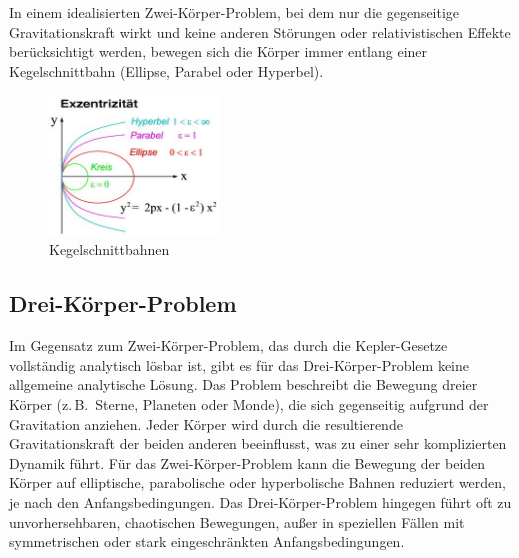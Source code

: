 \documentclass[a4paper,12pt,twoside]{article}
\begin{document}
In einem idealisierten Zwei-Körper-Problem, bei dem nur die gegenseitige Gravitationskraft wirkt und keine anderen Störungen oder relativistischen Effekte berücksichtigt werden, bewegen sich die Körper immer entlang einer Kegelschnittbahn (Ellipse, Parabel oder Hyperbel).
\begin{figure}[H]
	\centering
	\includegraphics[width=0.4\textwidth]{exzentrizitaet.jpg}
	\caption[Eintrag in Abbildungsverzeichnis von Kegelschnittbahnen]{Kegelschnittbahnen}
	\label{Exzentrizität}
\end{figure}

\subsection{Drei-Körper-Problem}
Im Gegensatz zum Zwei-Körper-Problem, das durch die Kepler-Gesetze vollständig analytisch lösbar ist, gibt es für das Drei-Körper-Problem keine allgemeine analytische Lösung. Das Problem beschreibt die Bewegung dreier Körper (z.\,B.\ Sterne, Planeten oder Monde), die sich gegenseitig aufgrund der Gravitation anziehen. Jeder Körper wird durch die resultierende Gravitationskraft der beiden anderen beeinflusst, was zu einer sehr komplizierten Dynamik führt.
Für das Zwei-Körper-Problem kann die Bewegung der beiden Körper auf elliptische, parabolische oder hyperbolische Bahnen reduziert werden, je nach den Anfangsbedingungen. Das Drei-Körper-Problem hingegen führt oft zu unvorhersehbaren, chaotischen Bewegungen, außer in speziellen Fällen mit symmetrischen oder stark eingeschränkten Anfangsbedingungen.
\end{document}
